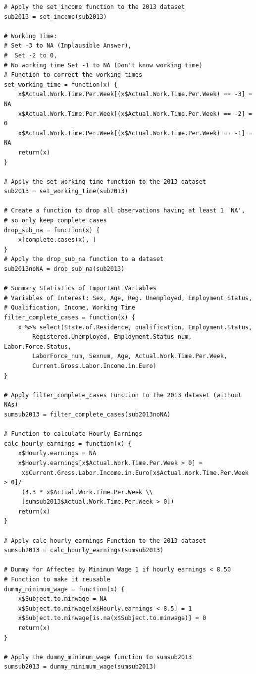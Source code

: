 \documentclass[a4paper]{article}
\begin{document}
{\begin{lstlisting}
# Apply the set_income function to the 2013 dataset
sub2013 = set_income(sub2013)

# Working Time: 
# Set -3 to NA (Implausible Answer),
#  Set -2 to 0, 
# No working time Set -1 to NA (Don't know working time)
# Function to correct the working times
set_working_time = function(x) {
    x$Actual.Work.Time.Per.Week[(x$Actual.Work.Time.Per.Week) == -3] = NA
    x$Actual.Work.Time.Per.Week[(x$Actual.Work.Time.Per.Week) == -2] = 0
    x$Actual.Work.Time.Per.Week[(x$Actual.Work.Time.Per.Week) == -1] = NA
    return(x)
}

# Apply the set_working_time function to the 2013 dataset
sub2013 = set_working_time(sub2013)

# Create a function to drop all observations having at least 1 'NA', 
# so only keep complete cases
drop_sub_na = function(x) {
    x[complete.cases(x), ]
}
# Apply the drop_sub_na function to a dataset
sub2013noNA = drop_sub_na(sub2013)

# Summary Statistics of Important Variables
# Variables of Interest: Sex, Age, Reg. Unemployed, Employment Status, 
# Qualification, Income, Working Time
filter_complete_cases = function(x) {
    x %>% select(State.of.Residence, qualification, Employment.Status, 
    	Registered.Unemployed, Employment.Status_num, Labor.Force.Status, 
        LaborForce_num, Sexnum, Age, Actual.Work.Time.Per.Week, 
        Current.Gross.Labor.Income.in.Euro)
}

# Apply filter_complete_cases Function to the 2013 dataset (without NAs)
sumsub2013 = filter_complete_cases(sub2013noNA)

# Function to calculate Hourly Earnings
calc_hourly_earnings = function(x) {
    x$Hourly.earnings = NA
    x$Hourly.earnings[x$Actual.Work.Time.Per.Week > 0] = 
     x$Current.Gross.Labor.Income.in.Euro[x$Actual.Work.Time.Per.Week > 0]/ 
     (4.3 * x$Actual.Work.Time.Per.Week \\
     [sumsub2013$Actual.Work.Time.Per.Week > 0])
    return(x)
}

# Apply calc_hourly_earnings Function to the 2013 dataset
sumsub2013 = calc_hourly_earnings(sumsub2013)

# Dummy for Affected by Minimum Wage 1 if hourly earnings < 8.50 
# Function to make it reusable
dummy_minimum_wage = function(x) {
    x$Subject.to.minwage = NA
    x$Subject.to.minwage[x$Hourly.earnings < 8.5] = 1
    x$Subject.to.minwage[is.na(x$Subject.to.minwage)] = 0
    return(x)
}

# Apply the dummy_minimum_wage function to sumsub2013
sumsub2013 = dummy_minimum_wage(sumsub2013)


\end{lstlisting}}
\end{document}
